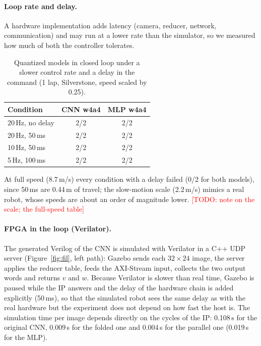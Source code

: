 \documentclass{article}
\newcommand{\TODO}[1]{\textcolor{red}{[TODO: #1]}}
\begin{document}
\paragraph{Loop rate and delay.}
A hardware implementation adds latency (camera, reducer, network, communication) and may run at a lower rate than the simulator, so we measured how much of both the controller tolerates.
\begin{table}[h]
\centering
\caption{Quantized models in closed loop under a slower control rate and a delay in the command (1 lap, Silverstone, speed scaled by 0.25).}
\begin{tabular}{lcc}
\toprule
Condition & CNN w4a4 & MLP w4a4\\
\midrule
20\,Hz, no delay & 2/2 & 2/2\\
20\,Hz, 50\,ms & 2/2 & 2/2\\
10\,Hz, 50\,ms & 2/2 & 2/2\\
5\,Hz, 100\,ms & 2/2 & 2/2\\
\bottomrule
\end{tabular}
\end{table}
At full speed (8.7\,m/s) every condition with a delay failed (0/2 for both models), since 50\,ms are 0.44\,m of travel; the slow-motion scale
(2.2\,m/s) mimics a real robot, whose speeds are about an order of magnitude lower. \TODO{note on the scale; the full-speed table}

\paragraph{FPGA in the loop (Verilator).}
The generated Verilog of the CNN is simulated with Verilator in a C++ UDP server (Figure~\ref{fig:fil}, left path): Gazebo sends each $32{\times}24$ image, the server applies the reducer
table, feeds the AXI-Stream input, collects the two output words and returns $v$ and $w$. Because Verilator is slower than real time, Gazebo is paused while the IP answers and the delay of the
hardware chain is added explicitly (50\,ms), so that the simulated robot sees the same delay as with the real hardware but the experiment does not depend on how fast the host is.
The simulation time per image depends directly on the cycles of the IP: 0.108\,s for the original CNN, 0.009\,s for the folded one and 0.004\,s for the parallel one (0.019\,s for the MLP).
\end{document}

